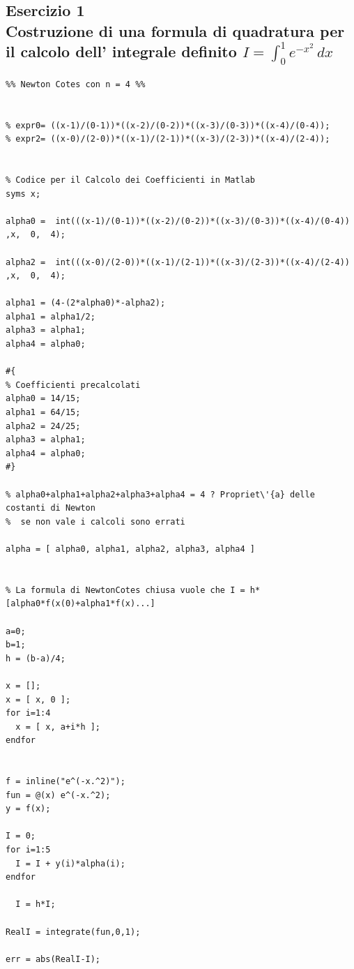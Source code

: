 \documentclass{article}
\begin{document}
\subsection{Esercizio 1 \\  Costruzione di una formula di quadratura per il calcolo dell' integrale definito $I=\int_{0}^{1} e^{-x^{2}}\,dx$}
\begin{lstlisting}
%% Newton Cotes con n = 4 %%


% expr0= ((x-1)/(0-1))*((x-2)/(0-2))*((x-3)/(0-3))*((x-4)/(0-4));
% expr2= ((x-0)/(2-0))*((x-1)/(2-1))*((x-3)/(2-3))*((x-4)/(2-4));


% Codice per il Calcolo dei Coefficienti in Matlab
syms x;

alpha0 =  int(((x-1)/(0-1))*((x-2)/(0-2))*((x-3)/(0-3))*((x-4)/(0-4))  ,x,  0,  4);

alpha2 =  int(((x-0)/(2-0))*((x-1)/(2-1))*((x-3)/(2-3))*((x-4)/(2-4))  ,x,  0,  4);

alpha1 = (4-(2*alpha0)*-alpha2);
alpha1 = alpha1/2;
alpha3 = alpha1;
alpha4 = alpha0;

#{
% Coefficienti precalcolati
alpha0 = 14/15;
alpha1 = 64/15;
alpha2 = 24/25;
alpha3 = alpha1;
alpha4 = alpha0; 
#}

% alpha0+alpha1+alpha2+alpha3+alpha4 = 4 ? Propriet\'{a} delle costanti di Newton
%  se non vale i calcoli sono errati

alpha = [ alpha0, alpha1, alpha2, alpha3, alpha4 ]


% La formula di NewtonCotes chiusa vuole che I = h*[alpha0*f(x(0)+alpha1*f(x)...]

a=0;
b=1;
h = (b-a)/4;

x = [];
x = [ x, 0 ];
for i=1:4
  x = [ x, a+i*h ];
endfor


f = inline("e^(-x.^2)");
fun = @(x) e^(-x.^2);
y = f(x);

I = 0;
for i=1:5
  I = I + y(i)*alpha(i);
endfor

  I = h*I;

RealI = integrate(fun,0,1);

err = abs(RealI-I);

\end{lstlisting}


\newpage
\end{document}
